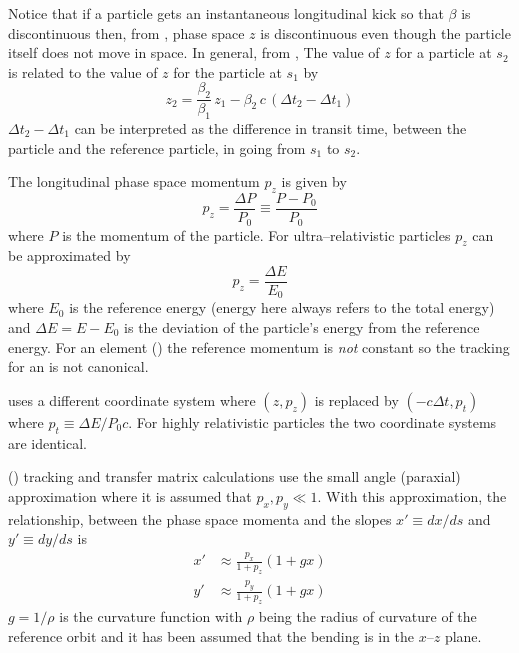 Notice that if a particle gets an instantaneous longitudinal kick so that $\beta$ is discontinuous
then, from , phase space $z$ is discontinuous even though the particle itself does not
move in space. In general, from , The value of $z$ for a particle at $s_2$ is related to
the value of $z$ for the particle at $s_1$ by
\begin{equation}
  z_2 = \frac{\beta_2}{\beta_1} \, z_1 - 
  \beta_2 \, c \, (\Delta t_2 - \Delta t_1)
  \label{zbbzb}
\end{equation}
$\Delta t_2 - \Delta t_1$ can be interpreted as the difference in
transit time, between the particle and the reference particle, in going
from $s_1$ to $s_2$.

The longitudinal phase space momentum $p_z$ is given by
\begin{equation}
  p_z = \frac{\Delta P}{P_0} \equiv \frac{P - P_0}{P_0}
  \label{ppppp}
\end{equation}
where $P$ is the momentum of the particle. For ultra--relativistic particles
$p_z$ can be approximated by
\begin{equation}
  p_z = \frac{\Delta E}{E_0}
\end{equation}
where $E_0$ is the reference energy (energy here always refers to the
total energy) and $\Delta E = E - E_0$ is the deviation of the
particle's energy from the reference energy. For an 
element () the reference momentum is {\it not} constant
so the tracking for an  is not canonical.

\mad uses a different coordinate system where $(z, p_z)$ is
replaced by $(-c\Delta t, p_t)$ where $p_t \equiv \Delta E / P_0
c$. For highly relativistic particles the two coordinate systems are
identical.

 () tracking and transfer matrix
calculations use the small angle (paraxial) approximation where it is
assumed that $p_x, p_y \ll 1$. With this approximation, the
relationship, between the phase space momenta and the slopes $x' \equiv
dx/ds$ and $y' \equiv dy/ds$ is
\begin{align}
  x' &\approx \frac{p_x}{1 + p_z} (1 + g x) \\
  y' &\approx \frac{p_y}{1 + p_z} (1 + g x) 
  \label{xpa1p}
\end{align}
$g = 1/\rho$ is the curvature function with $\rho$ being the radius of
curvature of the reference orbit and it has been assumed that the
bending is in the $x$--$z$ plane. 

